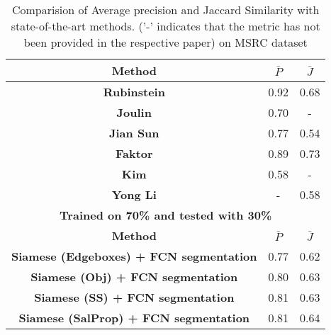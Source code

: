 \documentclass[conference]{IEEEtran}
\begin{document}
\begin{table}[]
\centering
\caption{Comparision of Average precision and Jaccard Similarity with state-of-the-art methods. ('-' indicates that the metric has not been provided in the respective paper) on MSRC dataset}
\label{perfmsrc}
\begin{tabular}{||c| c |c||}
\hline
\textbf{Method} & $\bar{\textit{P}}$ & $\bar{\textit{J}}$\\ \hline
\textbf{Rubinstein}\cite{Rubinstein13Unsupervised}                                       & 0.92                            & 0.68                            \\\hline
\textbf{Joulin}\cite{joulin2010discriminative}                                           & 0.70                             & -                                \\\hline
\textbf{Jian Sun}\cite{sun2016learning}                                           & 0.77                             & 0.54                                \\\hline
\textbf{Faktor}\cite{faktor2013co}                                           & 0.89                             & 0.73                             \\\hline
\textbf{Kim}\cite{kim2012multiple}                                              & 0.58                             & -                                \\\hline
\textbf{Yong Li}\cite{li2016object}                                          & -                            & 0.58                                \\\hline\hline
 \multicolumn{3}{||c||}{\textbf{Trained on 70\% and tested with 30\%}}                                                                   \\\hline
\textbf{Method} & $\bar{\textit{P}}$ & $\bar{\textit{J}}$\\\hline
\textbf{Siamese (Edgeboxes) + FCN segmentation}                                   & 0.77                             & 0.62                             \\\hline
\textbf{Siamese (Obj) + FCN segmentation}                                         & 0.80                            & 0.63                             \\\hline
\textbf{Siamese (SS) + FCN segmentation}                                          & 0.81                             & 0.63                             \\\hline
\textbf{Siamese (SalProp) + FCN segmentation}                                     & 0.81                             & 0.64                             \\\hline

\end{tabular}
\end{table}
\end{document}
